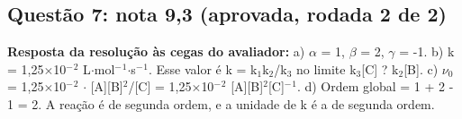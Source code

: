 \documentclass{article}%
\begin{document}
\subsection*{Questão 7: nota 9,3 (aprovada, rodada 2 de 2)}%
\textbf{Resposta da resolução às cegas do avaliador:} a) $\alpha$ = 1, $\beta$ = 2, $\gamma$ = -1.\newline%
b) k = 1,25$\times$10$^{-}$$^2$ L$\cdot$mol$^{-}$$^{1}$$\cdot$s$^{-}$$^{1}$. Esse valor é k = k$_{1}$k$_{2}$/k$_{3}$ no limite k$_{3}${[}C{]} ? k$_{2}${[}B{]}.\newline%
c) $\nu$$_{0}$ = 1,25$\times$10$^{-}$$^2$ $\cdot$ {[}A{]}{[}B{]}$^2$/{[}C{]} = 1,25$\times$10$^{-}$$^2$ {[}A{]}{[}B{]}$^2${[}C{]}$^{-}$$^{1}$.\newline%
d) Ordem global = 1 + 2 - 1 = 2. A reação é de segunda ordem, e a unidade de k é a de segunda ordem.\newline%
\newline%
\end{document}
